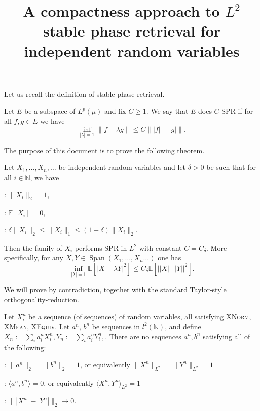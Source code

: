 \documentclass{inprogress}
\title{A compactness approach to $L^2$ stable phase retrieval for independent random variables}
\newcommand{\Span}{\operatorname{Span}}
\newcommand{\Hyp}[1]{\item[\textsc{#1}]\label{hyp:#1}\!\!\!\textsc{:}}
\newcommand{\hyp}[1]{\textsc{#1}}
\begin{document}
\maketitle

Let us recall the definition of stable phase retrieval.
\begin{theorem}
    Let $E$ be a subspace of $L^p(\mu)$ and fix $C\geq 1$. We say that $E$ does $C$-SPR if for all $f,g\in E$ we have
    \begin{equation}\label{C-SPR}
        \inf_{|\lambda|=1}\|f-\lambda g\|\leq C \| |f|-|g|\|.
    \end{equation}
\end{theorem}


The purpose of this document is to prove the following theorem.

\begin{theorem}
    \label{thm:goal}
    Let $X_1, \dots, X_n, \dots$ be independent random variables and let $\delta>0$ be such that for all $i\in \mathbb{N}$, we have
    \begin{hypotheses}
        \Hyp{XNorm} $\|X_i\|_2 = 1$,
        \Hyp{XMean} $\mathbb E[X_i] =  0$,
        \Hyp{XEquiv} $\delta \|X_i\|_2 \le \|X_i\|_1 \le (1-\delta) \|X_i\|_2$.
    \end{hypotheses}
    Then the family of $X_i$ performs SPR in $L^2$ with constant $C=C_\delta$. More specifically, for any $X, Y \in \Span(X_1, \dots, X_n \dots)$ one has \[
    \inf_{|\lambda|=1}\mathbb E[|X-\lambda Y|^2]\le C_\delta \mathbb E[||X|-|Y||^2].
    \]
\end{theorem}


We will prove  by contradiction, together with the standard Taylor-style orthogonality-reduction.


\begin{proposition}\label{by_contradiction}
Let $X_i^n$ be a sequence (of sequences) of random variables, all satisfying \hyp{XNorm}, \hyp{XMean}, \hyp{XEquiv}. Let $a^n$, $b^n$ be sequences in $l^2(\mathbb N)$, and define $X_n:= \sum_i a_i^n X_i^n, Y_n:= \sum_i a_i^n Y_i^n, $. There are no sequences $a^n, b^n$ satisfying all of the following:
\begin{hypotheses}
\Hyp{SNorm} $\|a^n\|_2 = \|b^n\|_2 = 1$, or equivalently $\|X^n\|_{L^2}=\|Y^n\|_{L^2}=1$
\Hyp{SOrth} $\langle a^n, b^n \rangle = 0$, or equivalently $\langle X^n,Y^n\rangle_{L^2}=1$
\Hyp{ASmall} $\| |X^n| - |Y^n| \|_2 \to 0$.
\end{hypotheses}

\end{proposition}
\end{document}
